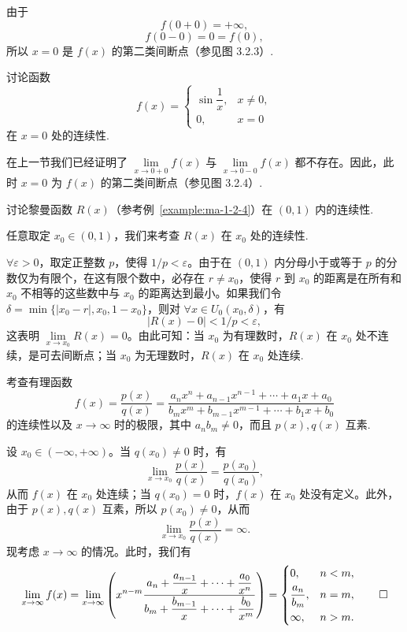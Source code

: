 \begin{solve}
由于
\[
  f(0+0)=+\infty,
\]
\[
  f(0-0)=0=f(0),
\]
所以 $x=0$ 是 $f(x)$ 的第二类间断点（参见图 3.2.3）.
\end{solve}


\begin{example}\label{example:ma-3-2-6}
讨论函数
\[
  f(x)=
  \begin{cases}
    \sin\dfrac1x, & x\ne0,\\
    0, & x=0
  \end{cases}
\]
在 $x=0$ 处的连续性.
\end{example}


\begin{solve}
在上一节我们已经证明了 $\lim\limits_{x\to0+0}f(x)$ 与 $\lim\limits_{x\to0-0}f(x)$ 都不存在。因此，此时 $x=0$ 为 $f(x)$ 的第二类间断点（参见图 3.2.4）.
\end{solve}


\begin{example}\label{example:ma-3-2-7}
讨论黎曼函数 $R(x)$（参考例~\ref{example:ma-1-2-4}）在 $(0,1)$ 内的连续性.
\end{example}


\begin{solve}
任意取定 $x_0\in(0,1)$，我们来考查 $R(x)$ 在 $x_0$ 处的连续性.

$\forall\varepsilon>0$，取定正整数 $p$，使得 $1/p<\varepsilon$。由于在 $(0,1)$ 内分母小于或等于 $p$ 的分数仅为有限个，在这有限个数中，必存在 $r\ne x_0$，使得 $r$ 到 $x_0$ 的距离是在所有和 $x_0$ 不相等的这些数中与 $x_0$ 的距离达到最小。如果我们令 $\delta=\min\{|x_0-r|,x_0,1-x_0\}$，则对 $\forall x\in U_0(x_0,\delta)$，有
\[
  |R(x)-0|<1/p<\varepsilon,
\]
这表明 $\lim\limits_{x\to x_0}R(x)=0$。由此可知：当 $x_0$ 为有理数时，$R(x)$ 在 $x_0$ 处不连续，是可去间断点；当 $x_0$ 为无理数时，$R(x)$ 在 $x_0$ 处连续.
\end{solve}


\begin{example}\label{example:ma-3-2-8}
考查有理函数
\[
  f(x)=\frac{p(x)}{q(x)}
  =
  \frac{a_nx^n+a_{n-1}x^{n-1}+\cdots+a_1x+a_0}
       {b_mx^m+b_{m-1}x^{m-1}+\cdots+b_1x+b_0}
\]
的连续性以及 $x\to\infty$ 时的极限，其中 $a_nb_m\ne0$，而且 $p(x),q(x)$ 互素.
\end{example}


\begin{solve}
设 $x_0\in(-\infty,+\infty)$。当 $q(x_0)\ne0$ 时，有
\[
  \lim_{x\to x_0}\frac{p(x)}{q(x)}=\frac{p(x_0)}{q(x_0)},
\]
从而 $f(x)$ 在 $x_0$ 处连续；当 $q(x_0)=0$ 时，$f(x)$ 在 $x_0$ 处没有定义。此外，由于 $p(x),q(x)$ 互素，所以 $p(x_0)\ne0$，从而
\[
  \lim_{x\to x_0}\frac{p(x)}{q(x)}=\infty.
\]
现考虑 $x\to\infty$ 的情况。此时，我们有
\[
  \lim_{x\to\infty}f(x)
  =
  \lim_{x\to\infty}
  \left(
    x^{n-m}\frac{a_n+\dfrac{a_{n-1}}x+\cdots+\dfrac{a_0}{x^n}}
    {b_m+\dfrac{b_{m-1}}x+\cdots+\dfrac{b_0}{x^m}}
  \right)
  =
  \begin{cases}
    0, & n<m,\\[4pt]
    \dfrac{a_n}{b_m}, & n=m,\\[6pt]
    \infty, & n>m.
  \end{cases}
\qedhere
\]
\end{solve}


